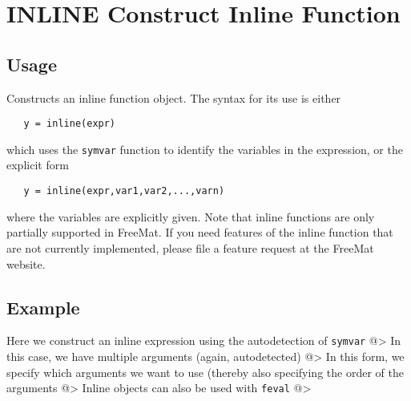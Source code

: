 \section{INLINE Construct Inline Function}

\subsection{Usage}

Constructs an inline function object.  The syntax for its use is
either
\begin{verbatim}
   y = inline(expr)
\end{verbatim}
which uses the \verb|symvar| function to identify the variables in the
expression, or the explicit form
\begin{verbatim}
   y = inline(expr,var1,var2,...,varn)
\end{verbatim}
where the variables are explicitly given.  Note that inline functions
are only partially supported in FreeMat.  If you need features of the
inline function that are not currently implemented, please file a
feature request at the FreeMat website.
\subsection{Example}

Here we construct an inline expression using the autodetection 
of \verb|symvar|
@>
In this case, we have multiple arguments (again, autodetected)
@>
In this form, we specify which arguments we want to use (thereby
also specifying the order of the arguments
@>
Inline objects can also be used with \verb|feval|
@>
